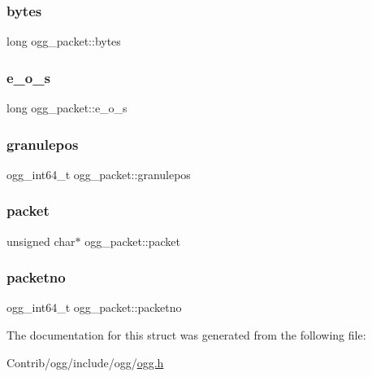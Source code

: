 \subsubsection{\texorpdfstring{bytes}{bytes}}
{\footnotesize\ttfamily long ogg\+\_\+packet\+::bytes}

\mbox{\label{structogg__packet_aa367e7c5425c5f65cbd126b82dfc72e8}} 
\subsubsection{\texorpdfstring{e\+\_\+o\+\_\+s}{e\_o\_s}}
{\footnotesize\ttfamily long ogg\+\_\+packet\+::e\+\_\+o\+\_\+s}

\mbox{\label{structogg__packet_a838d9a000e08bae982409bc2734fc566}} 
\subsubsection{\texorpdfstring{granulepos}{granulepos}}
{\footnotesize\ttfamily ogg\+\_\+int64\+\_\+t ogg\+\_\+packet\+::granulepos}

\mbox{\label{structogg__packet_a57e7096985ec8766dce415e248767c32}} 
\subsubsection{\texorpdfstring{packet}{packet}}
{\footnotesize\ttfamily unsigned char$\ast$ ogg\+\_\+packet\+::packet}

\mbox{\label{structogg__packet_a60e257b3a8f843135474457197c65a45}} 
\subsubsection{\texorpdfstring{packetno}{packetno}}
{\footnotesize\ttfamily ogg\+\_\+int64\+\_\+t ogg\+\_\+packet\+::packetno}



The documentation for this struct was generated from the following file\+:\begin{DoxyCompactItemize}
\item 
Contrib/ogg/include/ogg/\mbox{\hyperlink{ogg_8h}{ogg.\+h}}\end{DoxyCompactItemize}
